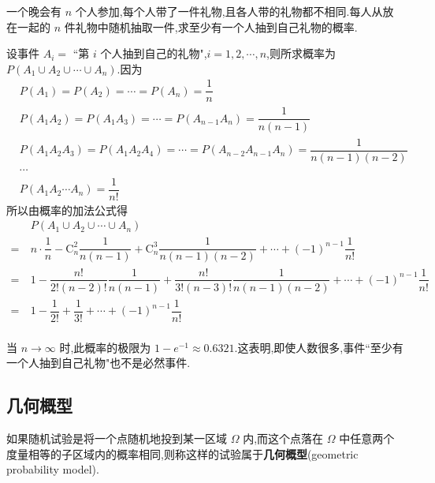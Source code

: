 \begin{example}[][配对问题]
    \indent 一个晚会有 $n$ 个人参加,每个人带了一件礼物,且各人带的礼物都不相同.每人从放在一起的 $n$ 件礼物中随机抽取一件,求至少有一个人抽到自己礼物的概率.
\end{example}

\begin{solution}
    设事件 $A_i=$ ``第 $i$ 个人抽到自己的礼物",$i=1,2,\cdots,n$,则所求概率为 $P(A_1 \cup A_2 \cup \cdots \cup A_n)$.因为
    $$
    \begin{aligned}
        & P(A_1) = P(A_2) = \cdots = P(A_n) = \dfrac{1}{n} \\
        & P(A_1 A_2) = P(A_1 A_3) = \cdots = P(A_{n-1} A_n) = \dfrac{1}{n(n-1)} \\
        & P(A_1 A_2 A_3) = P(A_1 A_2 A_4) = \cdots = P(A_{n-2} A_{n-1} A_n) = \dfrac{1}{n(n-1)(n-2)} \\
        & \cdots \\
        & P(A_1 A_2 \cdots A_n) = \dfrac{1}{n!}
    \end{aligned}
    $$
    所以由概率的加法公式得
    $$
    \begin{aligned}
        & P(A_1 \cup A_2 \cup \cdots \cup A_n) \\
        =\ & n \cdot \dfrac{1}{n} - \mathrm{C}_n^2 \dfrac{1}{n(n-1)} + \mathrm{C}_n^3 \dfrac{1}{n(n-1)(n-2)} + \cdots + (-1)^{n-1} \dfrac{1}{n!} \\
        =\ & 1 - \dfrac{n!}{2! (n-2)!} \dfrac{1}{n(n-1)} + \dfrac{n!}{3! (n-3)!} \dfrac{1}{n(n-1)(n-2)} + \cdots + (-1)^{n-1} \dfrac{1}{n!} \\
        =\ & 1 - \dfrac{1}{2!} + \dfrac{1}{3!} + \cdots + (-1)^{n-1} \dfrac{1}{n!} \\
    \end{aligned}
    $$
\end{solution}

\begin{note}
    \indent 当 $n \to \infty$ 时,此概率的极限为 $1 - e^{-1} \approx 0.6321$.这表明,即使人数很多,事件``至少有一个人抽到自己礼物"也不是必然事件.
\end{note}

\subsection{几何概型}

如果随机试验是将一个点随机地投到某一区域 $\varOmega$ 内,而这个点落在 $\varOmega$ 中任意两个度量相等的子区域内的概率相同,则称这样的试验属于\textbf{几何概型}(geometric probability model).

